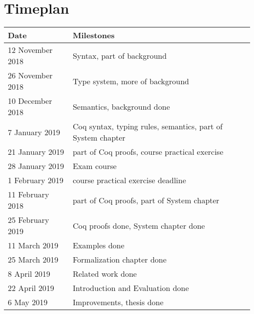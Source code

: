 \documentclass[12pt]{article}
\begin{document}
\section{Timeplan}
\begin{tabular}{ l | l }
\textbf{Date}             & \textbf{Milestones}                      \\ \hline
12 November 2018 & Syntax, part of background      \\ \hline
26 November 2018 & Type system, more of background \\ \hline
10 December 2018 & Semantics, background done      \\ \hline
7 January 2019 & Coq syntax, typing rules, semantics, part of System chapter  \\ \hline
21 January 2019 &  part of Coq proofs, course practical exercise  \\ \hline
28 January 2019 & Exam course \\ \hline
1 February 2019 & course practical exercise deadline    \\ \hline
11 February 2018 & part of Coq proofs, part of System chapter      \\ \hline
25 February 2019 & Coq proofs done, System chapter done      \\ \hline
11 March 2019 & Examples done      \\ \hline
25 March 2019 & Formalization chapter done      \\ \hline
8 April 2019 & Related work done     \\ \hline
22 April 2019 & Introduction and Evaluation done      \\ \hline
6 May 2019 & Improvements, thesis done      \\ \hline
\end{tabular}
\end{document}

